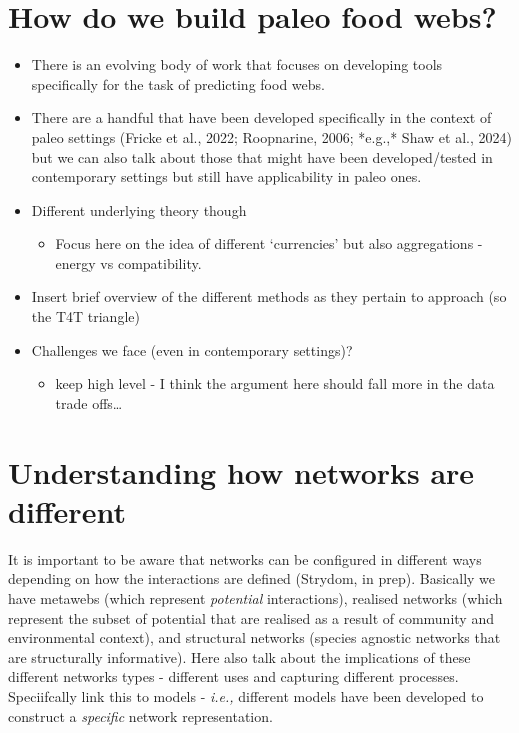 \documentclass[
]{article}
\providecommand{\tightlist}{%
  \setlength{\itemsep}{0pt}\setlength{\parskip}{0pt}}
\begin{document}
\section{How do we build paleo food
webs?}\label{how-do-we-build-paleo-food-webs}

\begin{itemize}
\item
  There is an evolving body of work that focuses on developing tools
  specifically for the task of predicting food webs.
\item
  There are a handful that have been developed specifically in the
  context of paleo settings (Fricke et al., 2022; Roopnarine, 2006;
  *e.g.,* Shaw et al., 2024) but we can also talk about those that might
  have been developed/tested in contemporary settings but still have
  applicability in paleo ones.
\item
  Different underlying theory though

  \begin{itemize}
  \tightlist
  \item
    Focus here on the idea of different `currencies' but also
    aggregations - energy vs compatibility.
  \end{itemize}
\item
  Insert brief overview of the different methods as they pertain to
  approach (so the T4T triangle)
\item
  Challenges we face (even in contemporary settings)?

  \begin{itemize}
  \tightlist
  \item
    keep high level - I think the argument here should fall more in the
    data trade offs\ldots{}
  \end{itemize}
\end{itemize}

\section{Understanding how networks are
different}\label{understanding-how-networks-are-different}

It is important to be aware that networks can be configured in different
ways depending on how the interactions are defined (Strydom, in prep).
Basically we have metawebs (which represent \emph{potential}
interactions), realised networks (which represent the subset of
potential that are realised as a result of community and environmental
context), and structural networks (species agnostic networks that are
structurally informative). Here also talk about the implications of
these different networks types - different uses and capturing different
processes. Speciifcally link this to models - \emph{i.e.,} different
models have been developed to construct a \emph{specific} network
representation.
\end{document}
